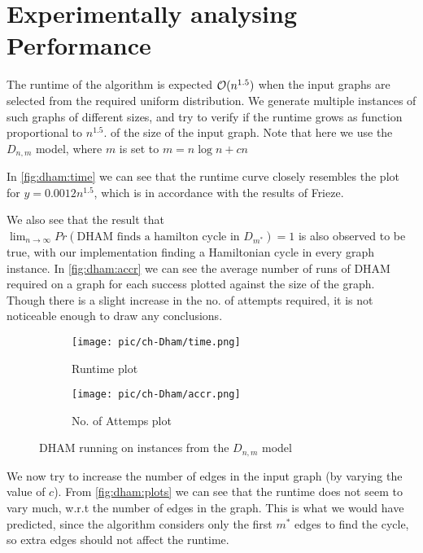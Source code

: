 \section{Experimentally analysing Performance}
The runtime of the algorithm is expected $\mathcal{O}(n^{1.5})$ when the input graphs are selected from the required uniform distribution. We generate multiple instances of such graphs of different sizes, and try to verify if the runtime grows as function proportional to $n^{1.5}$. of the size of the input graph.
Note that here we use the $D_{n, m}$ model, where $m$ is set to $m = n\log n + cn$

In \autoref{fig:dham:time} we can see that the runtime curve closely resembles the plot for $y = 0.0012 n^{1.5}$, which is in accordance with the results of Frieze\cite{frieze:dham}.

We also see that the result that
\( \lim_{n \rightarrow \infty} Pr( \text{DHAM finds a hamilton cycle in } D_{m^*} ) = 1 \) 
is also observed to be true, with our implementation finding a Hamiltonian cycle in every graph instance. In \autoref{fig:dham:accr} we can see the average number of runs of DHAM required on a graph for each success plotted against the size of the graph. Though there is a slight increase in the no. of attempts required, it is not noticeable enough to draw any conclusions.


\begin{figure}[ht]

\begin{subfigure}{\textwidth}
\centering
\texttt{[image: pic/ch-Dham/time.png]}
\caption{Runtime plot}
\label{fig:dham:time}
\end{subfigure}
\begin{subfigure}{\textwidth}
\centering
\texttt{[image: pic/ch-Dham/accr.png]}
\caption{No. of Attemps plot}
\label{fig:dham:accr}
\end{subfigure}

\caption{DHAM running on instances from the $D_{n, m}$ model}
\label{fig:dham:plots}
\end{figure}


We now try to increase the number of edges in the input graph (by varying the value of $c$). From \autoref{fig:dham:plots} we can see that the runtime does not seem to vary much, w.r.t the number of edges in the graph. This is what we would have predicted, since the algorithm considers only the first $m^*$ edges to find the cycle, so extra edges should not affect the runtime. 


